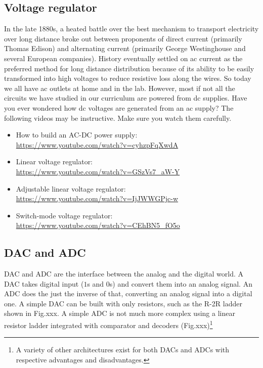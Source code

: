 \documentclass[letterpaper, 11pt]{article}
\begin{document}
\subsection{Voltage regulator}
In the late 1880s, a heated battle over the best mechanism to transport electricity over long distance broke out between proponents of direct current (primarily Thomas Edison) and alternating current (primarily George Westinghouse and several European companies). History eventually settled on ac current as the preferred method for long distance distribution because of its ability to be easily transformed into high voltages to reduce resistive loss along the wires. So today we all have ac outlets at home and in the lab. However, most if not all the circuits we have studied in our curriculum are powered from dc supplies. Have you ever wondered how dc voltages are generated from an ac supply? The following videos may be instructive. Make sure you watch them carefully. 

\begin{itemize}[itemsep=0.1ex]
	\item How to build an AC-DC power supply:\\ \url{https://www.youtube.com/watch?v=cyhzpFqXwdA} 
	\item Linear voltage regulator:\\ \url{https://www.youtube.com/watch?v=GSzVs7_aW-Y}
	\item Adjustable linear voltage regulator:\\  \url{https://www.youtube.com/watch?v=IjJWWGPjc-w}
	\item Switch-mode voltage regulator:\\ \url{https://www.youtube.com/watch?v=CEhBN5_fO5o}
\end{itemize}

\subsection{DAC and ADC}

DAC and ADC are the interface between the analog and the digital world. A DAC takes digital input ($1$s and $0$s) and convert them into an analog signal. An ADC does the just the inverse of that, converting an analog signal into a digital one. A simple DAC can be built with only resistors, such as the R-2R ladder shown in Fig.xxx. A simple ADC is not much more complex using a linear resistor ladder integrated with comparator and decoders (Fig.xxx)\footnote{A variety of other architectures exist for both DACs and ADCs with respective advantages and disadvantages.}
\end{document}
